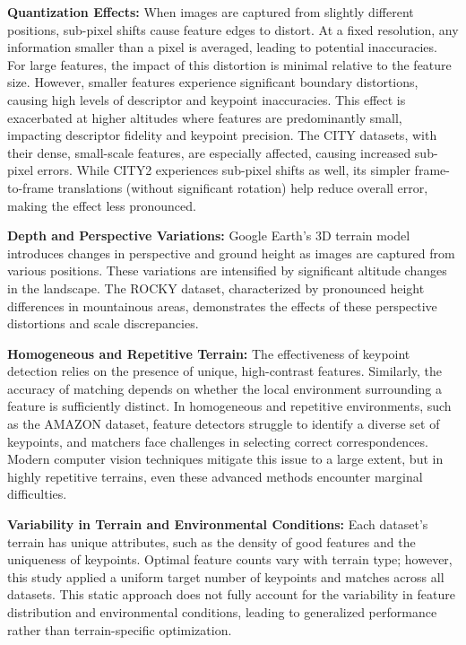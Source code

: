 \textbf{Quantization Effects:}  
When images are captured from slightly different positions, sub-pixel shifts cause feature edges to distort. At a fixed resolution, any information smaller than a pixel is averaged, leading to potential inaccuracies. For large features, the impact of this distortion is minimal relative to the feature size. However, smaller features experience significant boundary distortions, causing high levels of descriptor and keypoint inaccuracies. This effect is exacerbated at higher altitudes where features are predominantly small, impacting descriptor fidelity and keypoint precision. The CITY datasets, with their dense, small-scale features, are especially affected, causing increased sub-pixel errors. While CITY2 experiences sub-pixel shifts as well, its simpler frame-to-frame translations (without significant rotation) help reduce overall error, making the effect less pronounced.

\textbf{Depth and Perspective Variations:}  
Google Earth’s 3D terrain model introduces changes in perspective and ground height as images are captured from various positions. These variations are intensified by significant altitude changes in the landscape. The ROCKY dataset, characterized by pronounced height differences in mountainous areas, demonstrates the effects of these perspective distortions and scale discrepancies.

\textbf{Homogeneous and Repetitive Terrain:}  
The effectiveness of keypoint detection relies on the presence of unique, high-contrast features. Similarly, the accuracy of matching depends on whether the local environment surrounding a feature is sufficiently distinct. In homogeneous and repetitive environments, such as the AMAZON dataset, feature detectors struggle to identify a diverse set of keypoints, and matchers face challenges in selecting correct correspondences. Modern computer vision techniques mitigate this issue to a large extent, but in highly repetitive terrains, even these advanced methods encounter marginal difficulties.

\textbf{Variability in Terrain and Environmental Conditions:}  
Each dataset’s terrain has unique attributes, such as the density of good features and the uniqueness of keypoints. Optimal feature counts vary with terrain type; however, this study applied a uniform target number of keypoints and matches across all datasets. This static approach does not fully account for the variability in feature distribution and environmental conditions, leading to generalized performance rather than terrain-specific optimization.

